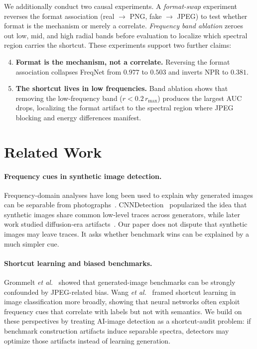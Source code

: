 \documentclass{article}
\begin{document}
We additionally conduct two causal experiments. A \emph{format-swap} experiment reverses the format association (real $\to$ PNG, fake $\to$ JPEG) to test whether format is the mechanism or merely a correlate. \emph{Frequency band ablation} zeroes out low, mid, and high radial bands before evaluation to localize which spectral region carries the shortcut. These experiments support two further claims:
\begin{enumerate}[itemsep=2pt,topsep=2pt]
  \setcounter{enumi}{3}
  \item \textbf{Format is the mechanism, not a correlate.} Reversing the format association collapses FreqNet from $0.977$ to $0.503$ and inverts NPR to $0.381$.
  \item \textbf{The shortcut lives in low frequencies.} Band ablation shows that removing the low-frequency band ($r < 0.2\,r_{\max}$) produces the largest AUC drops, localizing the format artifact to the spectral region where JPEG blocking and energy differences manifest.
\end{enumerate}


\section{Related Work}
\label{sec:related}

\paragraph{Frequency cues in synthetic image detection.}
Frequency-domain analyses have long been used to explain why generated images can be separable from photographs~\cite{corvi2023intriguing,frank2020leveraging,durall2020watch}.
CNNDetection~\cite{wang2020cnn} popularized the idea that synthetic images share common low-level traces across generators, while later work studied diffusion-era artifacts~\cite{ricker2024aeroblade,synthbuster2023}.
Our paper does not dispute that synthetic images may leave traces. It asks whether benchmark wins can be explained by a much simpler cue.

\paragraph{Shortcut learning and biased benchmarks.}
Grommelt \textit{et al.}~\cite{grommelt2024} showed that generated-image benchmarks can be strongly confounded by JPEG-related bias.
Wang \textit{et al.}~\cite{wang2023frequency} framed shortcut learning in image classification more broadly, showing that neural networks often exploit frequency cues that correlate with labels but not with semantics.
We build on these perspectives by treating AI-image detection as a shortcut-audit problem: if benchmark construction artifacts induce separable spectra, detectors may optimize those artifacts instead of learning generation.
\end{document}
